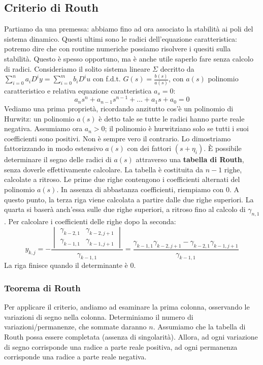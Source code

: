 \documentclass[11pt]{article}
\begin{document}
\subsection{Criterio di Routh}
Partiamo da una premessa: abbiamo fino ad ora associato la stabilità ai poli del sistema dinamico. Questi ultimi sono le radici dell'equazione caratteristica: potremo dire che con routine numeriche possiamo risolvere i quesiti sulla stabilità. Questo è spesso opportuno, ma è anche utile saperlo fare senza calcolo di radici. Consideriamo il solito sistema lineare $\Sigma$ decritto da $\sum_{i=0}^n a_i D^i y = \sum_{i=0}^m b_i D^i u$ con f.d.t. $G(s)= \frac{b(s)}{a(s)}$, con $a(s)$ polinomio caratteristico e relativa equazione caratteristica $a_s=0$:
\begin{displaymath}
    a_ns^n+a_{n-1}s^{n-1}+...+a_1s+a_0=0
\end{displaymath}
Vediamo una prima proprietà, ricordando anzitutto cos'è un polinomio di Hurwitz: un polinomio $a(s)$ è detto tale se tutte le radici hanno parte reale negativa. Assumiamo ora $a_n>0$; il polinomio è hurwitziano solo se tutti i suoi coefficienti sono positivi. Non è sempre vero il contrario. Lo dimostriamo fattorizzando in modo estensivo $a(s)$ con dei fattori $(s+\eta_i)$.
È possibile determinare il segno delle radici di $a(s)$ attraverso una \textbf{tabella di Routh}, senza doverle effettivamente calcolare. La tabella è costituita da $n-1$ righe, calcolate a ritroso. Le prime due righe contengono i coefficienti alternati del polinomio $a(s)$. In assenza di abbastanza coefficienti, riempiamo con 0. A questo punto, la terza riga viene calcolata a partire dalle due righe superiori. La quarta si baserà anch'essa sulle due righe superiori, a ritroso fino al calcolo di $\gamma_{n,1}$. Per calcolare i coefficienti delle righe dopo la seconda:
\begin{displaymath}
    y_{k,j}=-\frac{\begin{vmatrix}
        \gamma_{k-2,1} & \gamma_{k-2,j+1}\\
        \gamma_{k-1,1} & \gamma_{k-1,j+1}
    \end{vmatrix}}{\gamma_{k-1,1}}
    = \frac{\gamma_{k-1,1}\gamma_{k-2,j+1} - \gamma_{k-2,1}\gamma_{k-1,j+1}}{\gamma_{k-1,1}}
\end{displaymath}
La riga finisce quando il determinante è 0. 
\subsubsection{Teorema di Routh}
Per applicare il criterio, andiamo ad esaminare la prima colonna, osservando le variazioni di segno nella colonna. Determiniamo il numero di variazioni/permanenze, che sommate daranno $n$. 
Assumiamo che la tabella di Routh possa essere completata (assenza di singolarità). Allora, ad ogni variazione di segno corrisponde una radice a parte reale positiva, ad ogni permanenza corrisponde una radice a parte reale negativa.
\end{document}

